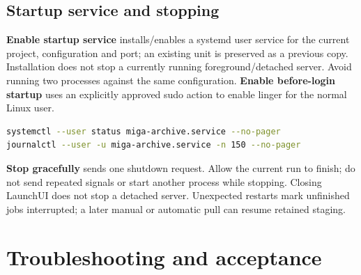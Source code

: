 \documentclass[11pt,oneside,openany]{book}
\newcommand{\ui}[1]{\textbf{#1}}
\begin{document}
\section{Startup service and stopping}
\ui{Enable startup service} installs/enables a systemd user service for the current
project, configuration and port; an existing unit is preserved as a previous copy.
Installation does not stop a currently running foreground/detached server. Avoid
running two processes against the same configuration. \ui{Enable before-login startup}
uses an explicitly approved sudo action to enable linger for the normal Linux user.
\begin{lstlisting}[language=bash]
systemctl --user status miga-archive.service --no-pager
journalctl --user -u miga-archive.service -n 150 --no-pager
\end{lstlisting}
\ui{Stop gracefully} sends one shutdown request. Allow the current run to finish;
do not send repeated signals or start another process while stopping. Closing
LaunchUI does not stop a detached server. Unexpected restarts mark unfinished jobs
interrupted; a later manual or automatic pull can resume retained staging.

\chapter{Troubleshooting and acceptance}
\end{document}
